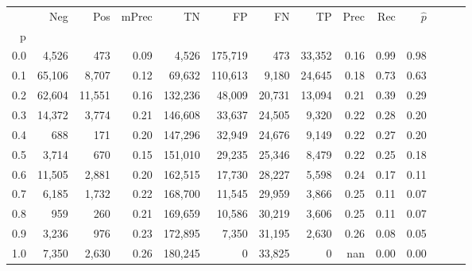 \begin{tabular}{rrrrrrrrrrrrrr}
\toprule
{} &     Neg &     Pos & mPrec &       TN &       FP &      FN &      TP &  Prec &   Rec & $\hat{p}$ \\
p   &         &         &       &          &          &         &         &       &       &           \\
\midrule
0.0 &   4,526 &     473 &  0.09 &    4,526 &  175,719 &     473 &  33,352 &  0.16 &  0.99 &      0.98 \\
0.1 &  65,106 &   8,707 &  0.12 &   69,632 &  110,613 &   9,180 &  24,645 &  0.18 &  0.73 &      0.63 \\
0.2 &  62,604 &  11,551 &  0.16 &  132,236 &   48,009 &  20,731 &  13,094 &  0.21 &  0.39 &      0.29 \\
0.3 &  14,372 &   3,774 &  0.21 &  146,608 &   33,637 &  24,505 &   9,320 &  0.22 &  0.28 &      0.20 \\
0.4 &     688 &     171 &  0.20 &  147,296 &   32,949 &  24,676 &   9,149 &  0.22 &  0.27 &      0.20 \\
0.5 &   3,714 &     670 &  0.15 &  151,010 &   29,235 &  25,346 &   8,479 &  0.22 &  0.25 &      0.18 \\
0.6 &  11,505 &   2,881 &  0.20 &  162,515 &   17,730 &  28,227 &   5,598 &  0.24 &  0.17 &      0.11 \\
0.7 &   6,185 &   1,732 &  0.22 &  168,700 &   11,545 &  29,959 &   3,866 &  0.25 &  0.11 &      0.07 \\
0.8 &     959 &     260 &  0.21 &  169,659 &   10,586 &  30,219 &   3,606 &  0.25 &  0.11 &      0.07 \\
0.9 &   3,236 &     976 &  0.23 &  172,895 &    7,350 &  31,195 &   2,630 &  0.26 &  0.08 &      0.05 \\
1.0 &   7,350 &   2,630 &  0.26 &  180,245 &        0 &  33,825 &       0 &   nan &  0.00 &      0.00 \\
\bottomrule
\end{tabular}
